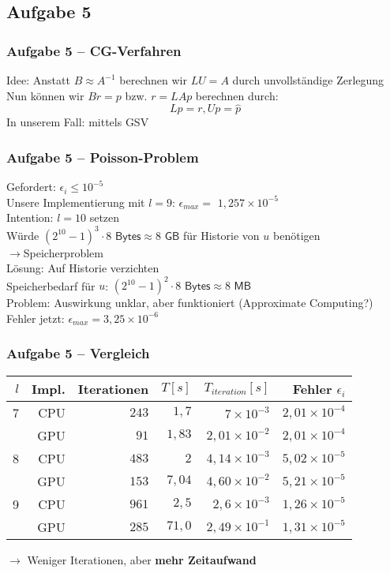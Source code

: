 \documentclass[german,notes,18pt]{beamer}
\begin{document}
	\subsection{Aufgabe 5}
	\begin{frame}
		\frametitle{Aufgabe 5 -- CG-Verfahren}
		Idee: Anstatt $B\approx A^{-1}$ berechnen wir $LU=A$ durch unvollständige Zerlegung \\
		Nun können wir $Br=p$ bzw. $r=LAp$ berechnen durch:
		\begin{equation*}
			L\hat{p}=r, Up=\hat{p}
		\end{equation*}
		In unserem Fall: mittels GSV
	\end{frame}
	\begin{frame}
		\frametitle{Aufgabe 5 -- Poisson-Problem}
		Gefordert: $\epsilon_i\leq10^{-5}$ \\
		Unsere Implementierung mit $l=9$: $\epsilon_{max}=$ {\color{lightred}$1,257\times10^{-5}$} \\
		\vspace{2em}
		\pause
		Intention: $l=10$ setzen \\
		Würde $(2^{10}-1)^3\cdot8\textsf{ Bytes}\approx${\color{lightred}$8\textsf{ GB}$} für Historie von $u$ benötigen \\
		$\rightarrow$Speicherproblem \\
		\vspace{2em}
		\pause
		Lösung: Auf Historie verzichten \\
		Speicherbedarf für $u$: $(2^{10}-1)^2\cdot8\textsf{ Bytes}\approx${\color{lightgreen}$8\textsf{ MB}$} \\
		Problem: Auswirkung unklar, aber funktioniert (Approximate Computing?) \\
		Fehler jetzt: $\epsilon_{max}=${\color{lightgreen}$3,25\times10^{-6}$}
	\end{frame}
	\begin{frame}
		\frametitle{Aufgabe 5 -- Vergleich}
		\begin{center}
			\begin{tabular}{r|r|r|r|r|r}
				$l$ & Impl. & Iterationen & $T[s]$ & $T_{iteration}[s]$ & Fehler $\epsilon_i$ \\
				\hline
				7 & CPU & $243$ & $1,7$ & $7\times10^{-3}$ & $2,01\times10^{-4}$ \\
				& GPU & $91$ & $1,83$ & $2,01\times10^{-2}$ & $2,01\times10^{-4}$ \\
				\hline
				8 & CPU & $483$ & $2$ & $4,14\times10^{-3}$ & $5,02\times10^{-5}$ \\
				& GPU & $153$ & $7,04$ & $4,60\times10^{-2}$ & $5,21\times10^{-5}$ \\
				\hline
				9 & CPU & $961$ & $2,5$ & $2,6\times10^{-3}$ & $1,26\times10^{-5}$ \\
				& GPU & $285$ & $71,0$ & $2,49\times10^{-1}$ & $1,31\times10^{-5}$ \\
			\end{tabular}
		\end{center}
		$\rightarrow$ Weniger Iterationen, aber \textbf{mehr Zeitaufwand}
	\end{frame}
\end{document}
